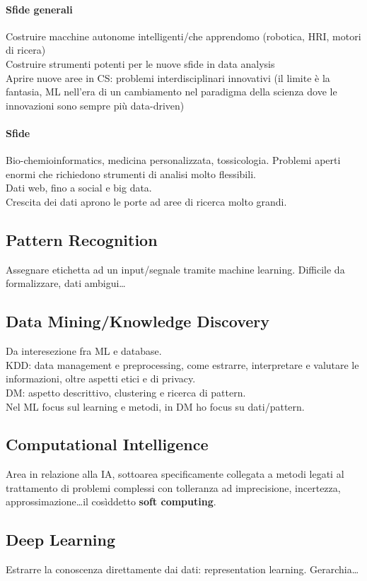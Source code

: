 \documentclass[10pt]{book}
\begin{document}
\paragraph{Sfide generali} Costruire macchine autonome intelligenti/che apprendomo (robotica, HRI, motori di ricera)\\
Costruire strumenti potenti per le nuove sfide in data analysis\\
Aprire nuove aree in CS: problemi interdisciplinari innovativi (il limite è la fantasia, ML nell'era di un cambiamento nel paradigma della scienza dove le innovazioni sono sempre più data-driven)
\paragraph{Sfide} Bio-chemioinformatics, medicina personalizzata, tossicologia. Problemi aperti enormi che richiedono strumenti di analisi molto flessibili.\\
Dati web, fino a social e big data.\\
Crescita dei dati aprono le porte ad aree di ricerca molto grandi.
\subsection{Pattern Recognition}
Assegnare etichetta ad un input/segnale tramite machine learning. Difficile da formalizzare, dati ambigui\ldots
\subsection{Data Mining/Knowledge Discovery}
Da interesezione fra ML e database.\\
KDD: data management e preprocessing, come estrarre, interpretare e valutare le informazioni, oltre aspetti etici e di privacy.\\
DM: aspetto descrittivo, clustering e ricerca di pattern.\\
Nel ML focus sul learning e metodi, in DM ho focus su dati/pattern.
\subsection{Computational Intelligence}
Area in relazione alla IA, sottoarea specificamente collegata a metodi legati al trattamento di problemi complessi con tolleranza ad imprecisione, incertezza, approssimazione\ldots il cosìddetto \textbf{soft computing}.
\subsection{Deep Learning} Estrarre la conoscenza direttamente dai dati: representation learning. Gerarchia\ldots
\end{document}
